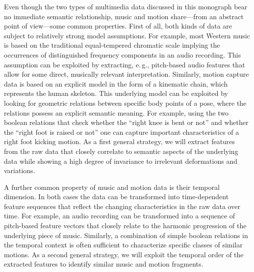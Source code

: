 Even though the two types of multimedia data discussed in this monograph
bear no immediate semantic relationship, music and motion
share---from an abstract point of view---some common properties.
First of all, both kinds of data are subject to relatively strong model assumptions. %
For example, most Western music is based on the traditional
equal-tempered chromatic scale implying the occurrences of distinguished
frequency components in an audio recording. This assumption
can be exploited by extracting, e.\,g., pitch-based audio features
that allow for some direct, musically relevant interpretation.
%
Similarly, motion capture data is based on an explicit model in the form of a
kinematic chain, which represents the human skeleton.
This underlying model can be exploited by looking for geometric relations
between specific body points of a pose, where the relations possess
an explicit semantic meaning.
For example, using the two boolean relations that check whether
the ``right knee is bent or not'' and whether
the ``right foot is raised or not'' one can capture
important characteristics of a right foot kicking motion.
%
As a first general strategy, we will extract features from the raw data
that closely correlate to semantic aspects of the underlying data
while showing a high degree of invariance to irrelevant deformations and variations.

A further common property of music and motion data is their
temporal dimension. %
In both cases the data can be transformed into time-dependent feature sequences
that reflect the changing characteristics in the raw data over time.
For example, an audio recording can be
transformed into a sequence of pitch-based feature vectors that
closely relate to the harmonic progression of the underlying piece
of music. Similarly, a combination of simple boolean relations
in the temporal context is often sufficient to characterize specific
classes of similar motions.
As a second general strategy, we will exploit the temporal order
of the extracted features to identify similar music and motion fragments.

